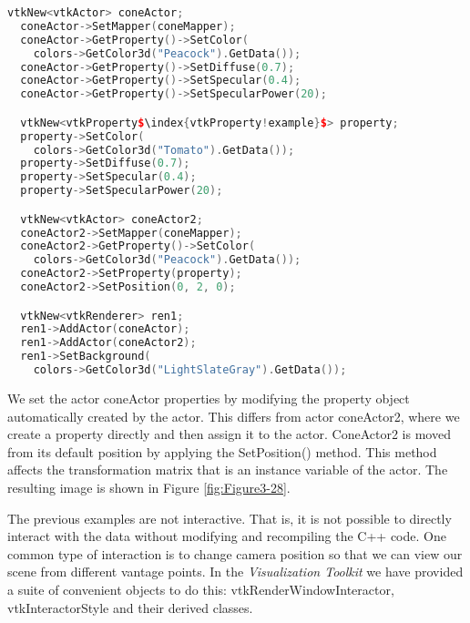 \begin{description}[leftmargin=0cm,labelindent=0cm]
\begin{lstlisting}[language=C++, caption={Cone4.cxx}, escapechar=\$]
  vtkNew<vtkActor> coneActor;
  coneActor->SetMapper(coneMapper);
  coneActor->GetProperty()->SetColor(
    colors->GetColor3d("Peacock").GetData());
  coneActor->GetProperty()->SetDiffuse(0.7);
  coneActor->GetProperty()->SetSpecular(0.4);
  coneActor->GetProperty()->SetSpecularPower(20);

  vtkNew<vtkProperty$\index{vtkProperty!example}$> property;
  property->SetColor(
    colors->GetColor3d("Tomato").GetData());
  property->SetDiffuse(0.7);
  property->SetSpecular(0.4);
  property->SetSpecularPower(20);

  vtkNew<vtkActor> coneActor2;
  coneActor2->SetMapper(coneMapper);
  coneActor2->GetProperty()->SetColor(
    colors->GetColor3d("Peacock").GetData());
  coneActor2->SetProperty(property);
  coneActor2->SetPosition(0, 2, 0);

  vtkNew<vtkRenderer> ren1;
  ren1->AddActor(coneActor);
  ren1->AddActor(coneActor2);
  ren1->SetBackground(
    colors->GetColor3d("LightSlateGray").GetData());

\end{lstlisting}

We set the actor coneActor properties by modifying the property object automatically created by the actor. This differs from actor coneActor2, where we create a property directly and then assign it to the actor. ConeActor2 is moved from its default position by applying the SetPosition() method. This method affects the transformation matrix that is an instance variable of the actor. The resulting image is shown in Figure \ref{fig:Figure3-28}.

\item[Introducing vtkRenderWindowInteractor]
\label{subsec:examples_introducing_vtkRenderWindowInteractor}

The previous examples are not interactive. That is, it is not possible to directly interact with the data without modifying and recompiling the C++ code. One common type of interaction is to change camera position so that we can view our scene from different vantage points. In the \emph{Visualization Toolkit} we have provided a suite of convenient objects to do this: vtkRenderWindowInteractor, vtkInteractorStyle and their derived classes.


\end{description}
